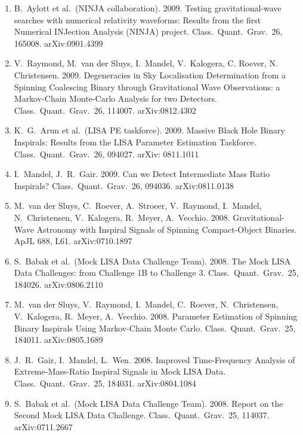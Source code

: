 \documentclass[margin,line]{res}
\begin{document}
\begin{resume}
\begin{enumerate}
\item  B.~Aylott et al.~(NINJA collaboration).  2009. Testing gravitational-wave searches with numerical relativity waveforms: Results from the first Numerical INJection Analysis (NINJA) project.  Class.~Quant.~Grav.~26, 165008.  arXiv:0901.4399

\item  V.~Raymond, M.~van der Sluys, I.~Mandel, V.~Kalogera, C. Roever, N. Christensen.  2009. Degeneracies in Sky Localisation Determination from a Spinning Coalescing Binary through Gravitational Wave Observations: a Markov-Chain Monte-Carlo Analysis for two Detectors. Class.~Quant.~Grav.~26, 114007.  arXiv:0812.4302

\item  K.~G.~Arun et al.~(LISA PE taskforce). 2009.  Massive Black Hole Binary Inspirals: Results from the LISA Parameter Estimation Taskforce.  Class.~Quant.~Grav.~26, 094027.  arXiv: 0811.1011

\item  I.~Mandel, J.~R.~Gair.  2009.  Can we Detect Intermediate Mass Ratio Inspirals?  Class.~Quant.~Grav.~26, 094036.  arXiv:0811.0138

\item  M.~van der Sluys, C.~Roever, A.~Stroeer, V.~Raymond, I.~Mandel, N.~Christensen, 
V.~Kalogera, R.~Meyer, A.~Vecchio. 2008.  Gravitational-Wave Astronomy with Inspiral Signals of Spinning Compact-Object Binaries.  ApJL 688, L61. arXiv:0710.1897

\item  S.~Babak et al.~(Mock LISA Data Challenge Team). 2008. The Mock LISA Data Challenges: from Challenge 1B to Challenge 3.  Class.~Quant.~Grav.~25, 184026.
arXiv:0806.2110 

\item  M.~van der Sluys, V.~Raymond, I.~Mandel, C.~Roever, N.~Christensen, 
V.~Kalogera, R.~Meyer, A.~Vecchio.  2008. Parameter Estimation of 
Spinning Binary Inspirals Using Markov-Chain Monte Carlo.  Class.~Quant.~Grav.~25, 184011.
arXiv:0805.1689

\item  J.~R.~Gair, I.~Mandel, L.~Wen. 2008. Improved Time-Frequency Analysis of 
Extreme-Mass-Ratio Inspiral Signals in Mock LISA Data. Class.~Quant.~Grav.~25, 184031.
arXiv:0804.1084

\item  S.~Babak et al.~(Mock LISA Data Challenge Team). 2008. Report on the 
Second Mock LISA Data Challenge.  Class.~Quant.~Grav.~25, 114037.
arXiv:0711.2667


\end{enumerate}
\end{resume}
\end{document}
